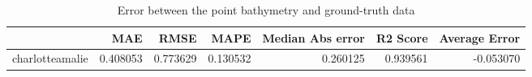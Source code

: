 \begin{table}[h!]
\caption{Error between the point bathymetry and ground-truth data}
\label{tab:charlotteamalie_lidar_error}
\begin{tabular}{lrrrrrr}
\toprule
 & MAE & RMSE & MAPE & Median Abs error & R2 Score & Average Error \\
\midrule
charlotteamalie & 0.408053 & 0.773629 & 0.130532 & 0.260125 & 0.939561 & -0.053070 \\
\bottomrule
\end{tabular}
\end{table}
